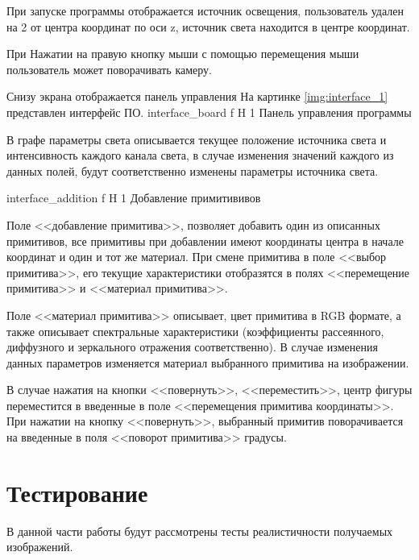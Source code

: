 При запуске программы отображается источник освещения, пользователь удален на 2 от центра координат по оси z, источник света находится в центре координат. 

При Нажатии на правую кнопку мыши с помощью перемещения мыши пользователь может поворачивать камеру.

Снизу экрана отображается панель управления 
На картинке \ref{img:interface_1} представлен интерфейс ПО.
{interface_board} %
{f} %
{H} %
{1\textwidth} %
{Панель управления программы} %

В графе параметры света описывается текущее положение источника света
и интенсивность каждого канала света, в случае изменения значений каждого из данных полей, будут соответственно изменены параметры источника света.

{interface_addition} %
{f} %
{H} %
{1\textwidth} %
{Добавление примитививов} %

Поле <<добавление примитива>>, позволяет добавить один из описанных примитивов, все примитивы при добавлении имеют координаты центра в начале координат и один и тот же материал.
При смене примитива в поле <<выбор примитива>>, его текущие характеристики отобразятся в полях <<перемещение примитива>>  и <<материал примитива>>.

Поле <<материал примитива>> описывает, цвет примитива в RGB формате,
а также описывает спектральные характеристики (коэффициенты рассеянного, диффузного и зеркального отражения соответственно).
В случае изменения данных параметров изменяется материал выбранного примитива на изображении.

В случае нажатия  на кнопки <<повернуть>>, <<переместить>>,
центр фигуры переместится в введенные в поле <<перемещения примитива координаты>>. При нажатии на кнопку <<повернуть>>, выбранный примитив
поворачивается на введенные в поля <<поворот примитива>> градусы.

\section{Тестирование}
В данной части работы будут рассмотрены тесты реалистичности получаемых изображений.

